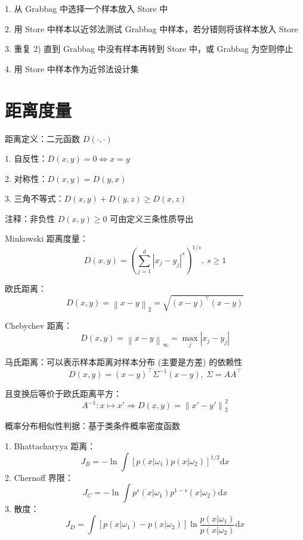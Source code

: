 \documentclass[openany]{ctexbook}
\theoremstyle{kaiti}
\theoremstyle{normal}
\begin{document}
1. 从 Grabbag 中选择一个样本放入 Store 中

2. 用 Store 中样本以近邻法测试 Grabbag 中样本，若分错则将该样本放入 Store

3. 重复 2) 直到 Grabbag 中没有样本再转到 Store 中，或 Grabbag 为空则停止

4. 用 Store 中样本作为近邻法设计集

\section{距离度量}

距离定义：二元函数 $D\left(\cdot ,\cdot \right)$

1. 自反性：$D\left(x,y \right)=0\Leftrightarrow x=y$

2. 对称性：$D\left(x,y \right)=D\left(y,x \right)$

3. 三角不等式：$D\left(x,y \right)+D\left(y,z \right)\geqslant D\left(x,z \right)$

注释：非负性 $D\left(x,y \right)\geqslant 0$ 可由定义三条性质导出

Minkowski 距离度量：
\begin{equation}
D\left(x,y \right)=\left(\sum_{j=1}^{d}|x_j-y_j|^s \right)^{1/s},~s\geqslant 1
\end{equation}

欧氏距离：
\begin{equation}
D\left(x,y \right)=\left\| x-y \right\|_2=\sqrt{\left(x-y \right)^{\top}\left(x-y \right)}
\end{equation}

Chebychev 距离：
\begin{equation}
D\left(x,y \right)=\left\| x-y \right\|_{\infty}=\max_j|x_j-y_j|
\end{equation}

马氏距离：可以表示样本距离对样本分布 (主要是方差) 的依赖性
\begin{equation}
D\left(x,y \right)=\left(x-y \right)^{\top}\Sigma ^{-1}\left(x-y \right),~\Sigma =AA^{\top}
\end{equation}

且变换后等价于欧氏距离平方：
\begin{equation}
A^{-1}:x\mapsto x'\Rightarrow D\left(x,y \right)=\left\| x'-y' \right\|_{2}^{2}
\end{equation}

概率分布相似性判据：基于类条件概率密度函数

1. Bhattacharyya 距离：
  \begin{equation}
  J_B=-\ln \int \left[p\left(x|\omega_1 \right)p\left(x|\omega_2 \right)\right] ^{1/2}\mathrm{d}x
  \end{equation}
2. Chernoff 界限：
  \begin{equation}
  J_C=-\ln \int p^s\left(x|\omega_1 \right)p^{1-s}\left(x|\omega_2 \right)\mathrm{d}x
  \end{equation}
3. 散度：
  \begin{equation}
  J_D=\int \left[p\left(x|\omega_1 \right)-p\left(x|\omega_2 \right)\right] \ln\frac{p\left(x|\omega_1 \right)}{p\left(x|\omega_2 \right)} \mathrm{d}x
  \end{equation}
\end{document}
